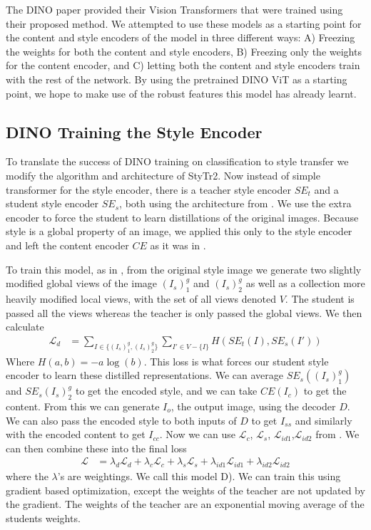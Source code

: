 \documentclass{article}
\begin{document}
The DINO paper provided their Vision Transformers that were trained using their proposed method. We attempted to use these models as a starting point for the content and style encoders of the model in three different ways: A) Freezing the weights for both the content and style encoders, B) Freezing only the weights for the content encoder, and C) letting both the content and style encoders train with the rest of the network. By using the pretrained DINO ViT as a starting point, we hope to make use of the robust features this model has already learnt. 

\subsection{DINO Training the Style Encoder}

To translate the success of DINO training on classification to style transfer we modify the algorithm and architecture of StyTr2. Now instead of simple transformer for the style encoder, there is a teacher style encoder $SE_t$ and a student style encoder $SE_s$, both using the architecture from \cite{ImageStyleTransformer}. We use the extra encoder to force the student to learn distillations of the original images. Because style is a global property of an image, we applied this only to the style encoder and left the content encoder $CE$ as it was in \cite{ImageStyleTransformer}. 

To train this model, as in \cite{DINO}, from the original style image we generate two slightly modified global views of the image $(I_s)^g_1$ and $(I_s)^g_2$ as well as a collection more heavily modified local views, with the set of all views denoted $V$. The student is passed all the views whereas the teacher is only passed the global views. We then calculate 
\begin{align}
	\mathcal L_d &= \sum_{I \in \{(I_s)^g_1, (I_s)^g_2\}} \sum_{I' \in V - \{ I \}} H(SE_t(I), SE_s(I'))
\end{align} 
Where $H(a,b) = -a \log (b)$. This loss is what forces our student style encoder to learn these distilled representations. We can average $SE_s((I_s)^g_1)$ and $SE_s(I_s)^g_2$ to get the encoded style, and we can take $CE(I_c)$ to get the content. From this we can generate $I_o$, the output image, using the decoder $D$. We can also pass the encoded style to both inputs of $D$ to get $I_{ss}$ and similarly with the encoded content to get $I_{cc}$. Now we can use $\mathcal L_c$, $\mathcal L_s$, $\mathcal L_{id1}$,$\mathcal L_{id2}$ from \cite{ImageStyleTransformer}. We can then combine these into the final loss
\begin{align}
	\mathcal L &= \lambda_d \mathcal L_d + \lambda_c \mathcal L_c + \lambda_s \mathcal L_s + \lambda_{id1} \mathcal L_{id1} + \lambda_{id2} \mathcal L_{id2}
\end{align}
where the $\lambda$'s are weightings. We call this model D). We can train this using gradient based optimization, except the weights of the teacher are not updated by the gradient. The weights of the teacher are an exponential moving average of the students weights. 
\end{document}
